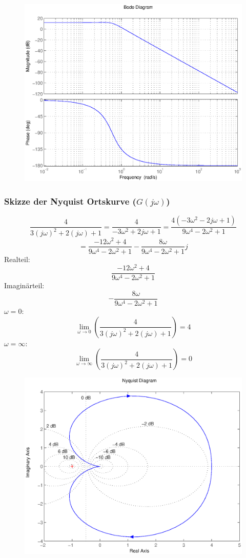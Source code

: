 \documentclass[a4paper,10pt,fleqn]{article}
\begin{document}
\begin{figure}[h!]
\center
\includegraphics[width=\textwidth]{bode.eps}
\end{figure}

\subsubsection*{Skizze der Nyquist Ortskurve ($G(j\omega)$)}
\[ \frac{4}{3(j\omega)^2 + 2(j\omega) + 1} = \frac{4}{-3 \omega^2 + 2 j \omega + 1} 
= \frac{4 (-3 \omega^2 - 2 j \omega + 1)}{9 \omega^4 - 2 \omega^2  + 1} \]
\[ = \frac{-12 \omega^2 + 4}{9 \omega^4 - 2 \omega^2 + 1} - \frac{8 \omega}{9 \omega^4 - 2 \omega^2 + 1}j \]
Realteil: 
\[  \frac{-12 \omega^2 + 4}{9 \omega^4 - 2 \omega^2 + 1} \]
Imaginärteil: 
\[ - \frac{8 \omega}{9 \omega^4 - 2 \omega^2 + 1} \]
$\omega = 0$:
\[ \lim\limits_{\omega \to 0}\left(\frac{4}{3 (j \omega)^2 + 2 (j \omega) + 1}\right) = 4 \]
$\omega = \infty$:
\[ \lim\limits_{\omega \to \infty}\left(\frac{4}{3 (j \omega)^2 + 2 (j \omega) + 1}\right) = 0 \]

\begin{figure}[h!]
\center
\includegraphics[width=\textwidth]{nyquist.eps}
\end{figure}
\end{document}
